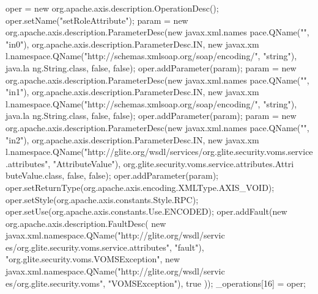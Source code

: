 \begin{DoxyCode}
{        oper = new org.apache.axis.description.OperationDesc();
        oper.setName("setRoleAttribute");
        param = new org.apache.axis.description.ParameterDesc(new javax.xml.names
      pace.QName("", "in0"), org.apache.axis.description.ParameterDesc.IN, new javax.xm
      l.namespace.QName("http://schemas.xmlsoap.org/soap/encoding/", "string"), java.la
      ng.String.class, false, false);
        oper.addParameter(param);
        param = new org.apache.axis.description.ParameterDesc(new javax.xml.names
      pace.QName("", "in1"), org.apache.axis.description.ParameterDesc.IN, new javax.xm
      l.namespace.QName("http://schemas.xmlsoap.org/soap/encoding/", "string"), java.la
      ng.String.class, false, false);
        oper.addParameter(param);
        param = new org.apache.axis.description.ParameterDesc(new javax.xml.names
      pace.QName("", "in2"), org.apache.axis.description.ParameterDesc.IN, new javax.xm
      l.namespace.QName("http://glite.org/wsdl/services/org.glite.security.voms.service
      .attributes", "AttributeValue"), org.glite.security.voms.service.attributes.Attri
      buteValue.class, false, false);
        oper.addParameter(param);
        oper.setReturnType(org.apache.axis.encoding.XMLType.AXIS_VOID);
        oper.setStyle(org.apache.axis.constants.Style.RPC);
        oper.setUse(org.apache.axis.constants.Use.ENCODED);
        oper.addFault(new org.apache.axis.description.FaultDesc(
                      new javax.xml.namespace.QName("http://glite.org/wsdl/servic
      es/org.glite.security.voms.service.attributes", "fault"),
                      "org.glite.security.voms.VOMSException",
                      new javax.xml.namespace.QName("http://glite.org/wsdl/servic
      es/org.glite.security.voms", "VOMSException"), 
                      true
                     ));
        _operations[16] = oper;

}
\end{DoxyCode}
